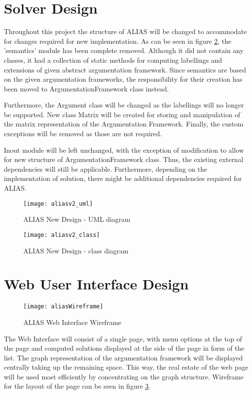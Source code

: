 \section{Solver Design}
Throughout this project the structure of ALIAS will be changed to accommodate for changes required for new implementation. As can be seen in figure \ref{fig:aliasUml2}, the 'semantics' module has been complete removed. Although it did not contain any classes, it had a collection of static methods for computing labellings and extensions of given abstract argumentation framework. Since semantics are based on the given argumentation frameworks, the responsibility for their creation has been moved to ArgumentationFramework class instead. 

Furthermore, the Argument class will be changed as the labellings will no longer be supported. New class Matrix will be created for storing and manipulation of the matrix representation of the Argumentation Framework. Finally, the custom exceptions will be removed as those are not required.

Inout module will be left unchanged, with the exception of modification to allow for new structure of ArgumentationFramework class. Thus, the existing external dependencies will still be applicable. Furthermore, depending on the implementation of solution, there might be additional dependencies required for ALIAS.

\begin{figure}[h]
	\texttt{[image: aliasv2\_uml]}
	\caption{ALIAS New Design - UML diagram}
	\label{fig:aliasUml2}
\end{figure}

\begin{figure}[h]
	\texttt{[image: aliasv2\_class]}
	\caption{ALIAS New Design - class diagram}
	\label{fig:aliasUml2}
\end{figure}

\section{Web User Interface Design}
\begin{figure}[h]
	\texttt{[image: aliasWireframe]}
	\caption{ALIAS Web Interface Wireframe}
	\label{fig:aliasWireframe}
\end{figure}
The Web Interface will consist of a single page, with menu options at the top of the page and computed solutions displayed at the side of the page in form of the list. The graph representation of the argumentation framework will be displayed centrally taking up the remaining space. This way, the real estate of the web page will be used most efficiently by concentrating on the graph structure. Wireframe for the layout of the page can be seen in figure \ref{fig:aliasWireframe}.



